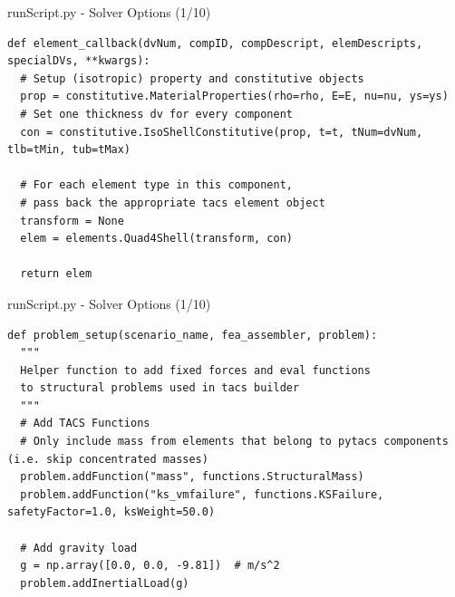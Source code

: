 \documentclass{bredelebeamer}
\begin{document}
\begin{frame}[fragile]{runScript.py - Solver Options (1/10)}
\scriptsize
\lstset{ language=bash }
\begin{lstlisting}
def element_callback(dvNum, compID, compDescript, elemDescripts, specialDVs, **kwargs):
  # Setup (isotropic) property and constitutive objects
  prop = constitutive.MaterialProperties(rho=rho, E=E, nu=nu, ys=ys)
  # Set one thickness dv for every component
  con = constitutive.IsoShellConstitutive(prop, t=t, tNum=dvNum, tlb=tMin, tub=tMax)

  # For each element type in this component,
  # pass back the appropriate tacs element object
  transform = None
  elem = elements.Quad4Shell(transform, con)

  return elem
\end{lstlisting}
\normalsize
\end{frame}

\begin{frame}[fragile]{runScript.py - Solver Options (1/10)}
\scriptsize
\lstset{ language=bash }
\begin{lstlisting}
def problem_setup(scenario_name, fea_assembler, problem):
  """
  Helper function to add fixed forces and eval functions
  to structural problems used in tacs builder
  """
  # Add TACS Functions
  # Only include mass from elements that belong to pytacs components (i.e. skip concentrated masses)
  problem.addFunction("mass", functions.StructuralMass)
  problem.addFunction("ks_vmfailure", functions.KSFailure, safetyFactor=1.0, ksWeight=50.0)

  # Add gravity load
  g = np.array([0.0, 0.0, -9.81])  # m/s^2
  problem.addInertialLoad(g)
\end{lstlisting}
\normalsize
\end{frame}
\end{document}
